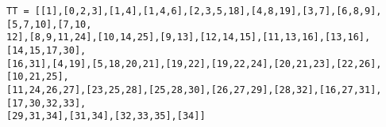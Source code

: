\begin{example}
\begin{verbatim}
TT = [[1],[0,2,3],[1,4],[1,4,6],[2,3,5,18],[4,8,19],[3,7],[6,8,9],[5,7,10],[7,10,
12],[8,9,11,24],[10,14,25],[9,13],[12,14,15],[11,13,16],[13,16],[14,15,17,30],
[16,31],[4,19],[5,18,20,21],[19,22],[19,22,24],[20,21,23],[22,26],[10,21,25],
[11,24,26,27],[23,25,28],[25,28,30],[26,27,29],[28,32],[16,27,31],[17,30,32,33],
[29,31,34],[31,34],[32,33,35],[34]]
\end{verbatim}

\end{example} %



